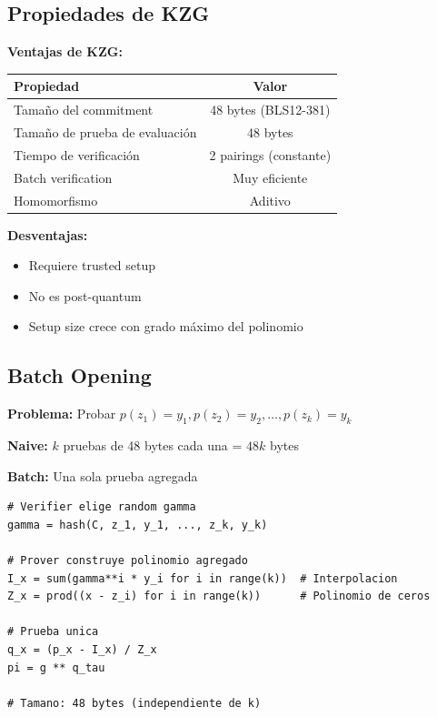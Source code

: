 \documentclass[11pt,a4paper,twoside]{book}
\begin{document}
\subsection{Propiedades de KZG}

\begin{keyidea}
\textbf{Ventajas de KZG:}

\begin{center}
\begin{tabular}{lc}
\toprule
\textbf{Propiedad} & \textbf{Valor} \\
\midrule
Tama\~no del commitment & 48 bytes (BLS12-381) \\
Tama\~no de prueba de evaluaci\'on & 48 bytes \\
Tiempo de verificaci\'on & 2 pairings (constante) \\
Batch verification & Muy eficiente \\
Homomorfismo & Aditivo \\
\bottomrule
\end{tabular}
\end{center}

\textbf{Desventajas:}
\begin{itemize}
    \item Requiere trusted setup
    \item No es post-quantum
    \item Setup size crece con grado m\'aximo del polinomio
\end{itemize}
\end{keyidea}

\subsection{Batch Opening}

\begin{example}
\textbf{Problema:} Probar $p(z_1) = y_1, p(z_2) = y_2, \ldots, p(z_k) = y_k$

\textbf{Naive:} $k$ pruebas de 48 bytes cada una = $48k$ bytes

\textbf{Batch:} Una sola prueba agregada

\begin{lstlisting}[style=python]
# Verifier elige random gamma
gamma = hash(C, z_1, y_1, ..., z_k, y_k)

# Prover construye polinomio agregado
I_x = sum(gamma**i * y_i for i in range(k))  # Interpolacion
Z_x = prod((x - z_i) for i in range(k))      # Polinomio de ceros

# Prueba unica
q_x = (p_x - I_x) / Z_x
pi = g ** q_tau

# Tamano: 48 bytes (independiente de k)
\end{lstlisting}
\end{example}
\end{document}
